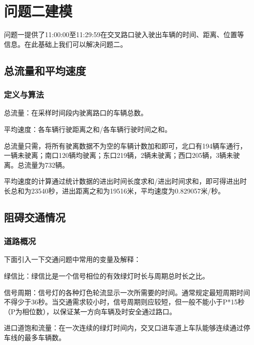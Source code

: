\section{问题二建模}
问题一提供了11:00:00至11:29:59在交叉路口驶入驶出车辆的时间、距离、位置等信息。在此基础上我们可以解决问题二。

\subsection{总流量和平均速度}

\subsubsection{定义与算法}
总流量：在采样时间段内驶离路口的车辆总数。

平均速度：各车辆行驶距离之和/各车辆行驶时间之和。

总流量只需，将所有驶离数据不为空的车辆计数加和即可，北口有194辆车通行，一辆未驶离；南口120辆均驶离；东口219辆，2辆未驶离；西口205辆，3辆未驶离。总流量为732辆。

平均速度的计算通过统计数据的进出时间长度求和/进出时间求和，即可得进出时长总和为23540秒，进出距离之和为19516米，平均速度为0.829057米/秒。

\subsection{阻碍交通情况}

\subsubsection{道路概况}

下面引入一下交通问题中常用的变量及解释：


绿信比：绿信比是一个信号相位的有效绿灯时长与周期总时长之比。

信号周期：信号灯的各种灯色轮流显示一次所需要的时间。通常规定最短周期时间不得少于36秒。当交通需求较小时，信号周期则应较短，但一般不能小于P*15秒（P为相位数），以保证某一方向车辆及时安全通过路口。

进口道饱和流量：在一次连续的绿灯时间内，交叉口进车道上车队能够连续通过停车线的最多车辆数。

